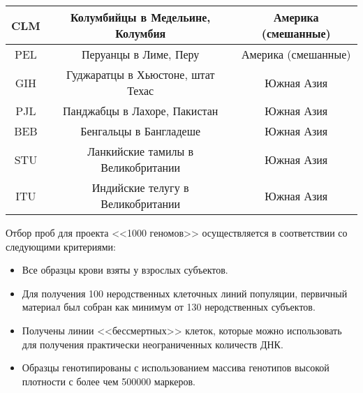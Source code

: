 \begin{table} [htbp]
\begin{threeparttable}
\begin{SingleSpace}
\begin{tabular}{| c | c | c |}
				CLM 	& Колумбийцы в Медельине, Колумбия 	& Америка (смешанные) \\ \hline
				PEL 	& Перуанцы в Лиме, Перу				& Америка (смешанные) \\ \hline
				GIH 	& Гуджаратцы в Хьюстоне, штат Техас & Южная Азия \\ \hline
				PJL 	& Панджабцы в Лахоре, Пакистан		& Южная Азия \\ \hline
				BEB 	& Бенгальцы в Бангладеше 			& Южная Азия \\ \hline
				STU 	& Ланкийские тамилы	в Великобритании										& Южная Азия \\ \hline
				ITU 	& Индийские телугу в Великобритании	& Южная Азия \\ \hline
			\end{tabular}%
		\end{SingleSpace}
	\end{threeparttable}
\end{table}

Отбор проб для проекта <<1000 геномов>> осуществляется в соответствии со следующими критериями:
\begin{itemize}
	\item Все образцы крови взяты у взрослых субъектов.
	\item Для получения 100 неродственных клеточных линий популяции, первичный материал был собран как минимум от 130 неродственных субъектов.
	\item Получены линии <<бессмертных>> клеток, которые можно использовать для получения практически неограниченных количеств ДНК.
	\item Образцы генотипированы с использованием массива генотипов высокой плотности с более чем 500000 маркеров.
\end{itemize}

